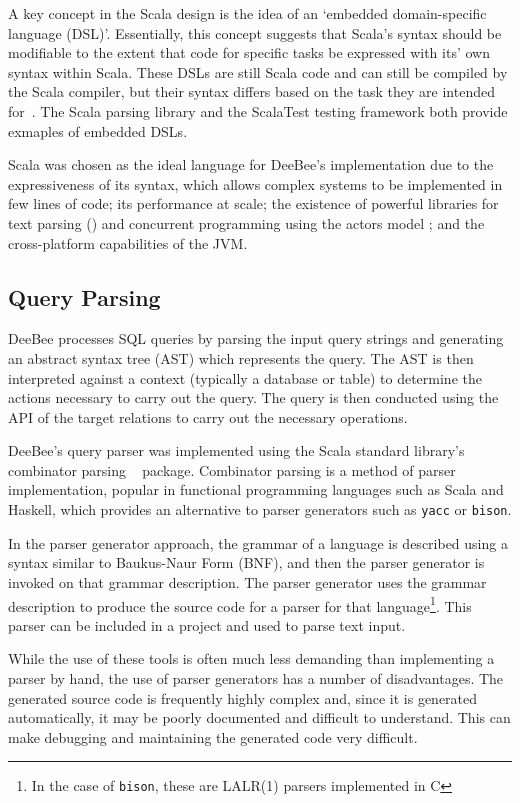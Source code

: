 A key concept in the Scala design is the idea of an `embedded domain-specific language (DSL)'. Essentially, this concept suggests that Scala's syntax should be modifiable to the extent that code for specific tasks be expressed with its' own syntax within Scala. These DSLs are still Scala code and can still be compiled by the Scala compiler, but their syntax differs based on the task they are intended for~\cite{ghosh2010dsls,hofer2008polymorphic,odersky2008programming}. The Scala parsing library and the ScalaTest testing framework both provide exmaples of embedded DSLs.

Scala was chosen as the ideal language for DeeBee's implementation due to the expressiveness of its syntax, which allows complex systems to be implemented in few lines of code; its performance at scale; the existence of powerful libraries for text parsing () and concurrent programming using the actors model ; and the cross-platform capabilities of the JVM.

\subsection{Query Parsing}
DeeBee processes SQL queries by parsing the input query strings and generating an abstract syntax tree (AST) which represents the query. The AST is then interpreted against a context (typically a database or table) to determine the actions necessary to carry out the query. The query is then conducted using the API of the target relations to carry out the necessary operations.

DeeBee's query parser was implemented using the Scala standard library's combinator parsing ~\cite{moors2008parser} package. Combinator parsing is a method of parser implementation, popular in functional programming languages such as Scala and Haskell, which provides an alternative to parser generators such as \texttt{yacc} or \texttt{bison}.

In the parser generator approach, the grammar of a language is described using a syntax similar to Baukus-Naur Form (BNF), and then the parser generator is invoked on that grammar description. The parser generator uses the grammar description to produce the source code for a parser for that language\footnote{In the case of \texttt{bison}, these are LALR(1) parsers implemented in C}. This parser can be included in a project and used to parse text input. 

While the use of these tools is often much less demanding than implementing a parser by hand, the use of parser generators has a number of disadvantages. The generated source code is frequently highly complex and, since it is generated automatically, it may be poorly documented and difficult to understand. This can make debugging and maintaining the generated code very difficult.

